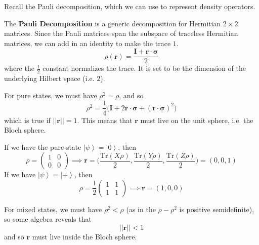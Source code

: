 \documentclass{article}
\newcommand{\ket}[1]{\ensuremath{\left|#1\right\rangle}}
\begin{document}
      Recall the Pauli decomposition, which we can use to represent density operators. 

      \begin{definition}
        The \textbf{Pauli Decomposition} is a generic decomposition for Hermitian $2 \times 2$ matrices. Since the Pauli matrices span the subspace of traceless Hermitian matrices, we can add in an identity to make the trace $1$. 
        \begin{equation}
          \rho(\mathbf{r}) = \frac{\mathbf{I} + \mathbf{r} \cdot \boldsymbol{\sigma}}{2}
        \end{equation}
        where the $\frac{1}{2}$ constant normalizes the trace. It is set to be the dimension of the underlying Hilbert space (i.e. $2$). 
      \end{definition}

      For pure states, we must have $\rho^2 = \rho$, and so 
      \begin{equation}
        \rho^2 = \frac{1}{4} \big( \mathbf{I} + 2 \mathbf{r} \cdot \boldsymbol{\sigma} + (\mathbf{r} \cdot \boldsymbol{\sigma})^2 \big)
      \end{equation}
      which is true if $||\mathbf{r}|| = 1$. This means that $\mathbf{r}$ must live on the unit sphere, i.e. the Bloch sphere. 

      \begin{example}[Pauli Decomposition of $\ket{0}$]
        If we have the pure state $\ket{\psi} = \ket{0}$, then 
        \begin{equation}
          \rho = \begin{pmatrix} 1 & 0 \\ 0 & 0 \end{pmatrix} \implies \mathbf{r} = \bigg( \frac{\mathrm{Tr}(X \rho)}{2}, \frac{\mathrm{Tr}(Y \rho)}{2}, \frac{\mathrm{Tr}(Z \rho)}{2} \bigg) = (0, 0, 1)
        \end{equation}
        If we have $\ket{\psi} = \ket{+}$, then 
        \begin{equation}
        \rho = \frac{1}{2} \begin{pmatrix} 1 & 1 \\ 1 & 1 \end{pmatrix} \implies \mathbf{r} = (1, 0, 0)
        \end{equation}
      \end{example}

      For mixed states, we must have $\rho^2 < \rho$ (as in the $\rho - \rho^2$ is positive semidefinite), so some algebra reveals that 
      \begin{equation}
        ||\mathbf{r}|| < 1
      \end{equation}
      and so $\mathbf{r}$ must live inside the Bloch sphere.
\end{document}
